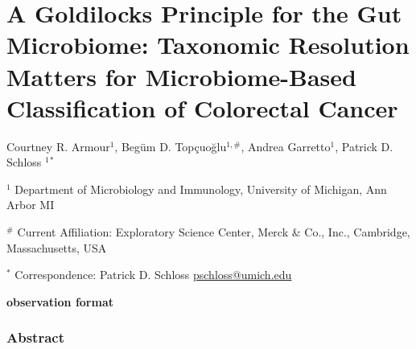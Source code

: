 \documentclass[
]{article}
\author{}
\date{\vspace{-2.5em}}
\begin{document}
\hypertarget{a-goldilocks-principle-for-the-gut-microbiome-taxonomic-resolution-matters-for-microbiome-based-classification-of-colorectal-cancer}{%
\section{A Goldilocks Principle for the Gut Microbiome: Taxonomic
Resolution Matters for Microbiome-Based Classification of Colorectal
Cancer}\label{a-goldilocks-principle-for-the-gut-microbiome-taxonomic-resolution-matters-for-microbiome-based-classification-of-colorectal-cancer}}

\vspace{10mm}

Courtney R. Armour\({^1}\), Begüm D. Topçuoğlu\(^{1,\#}\), Andrea
Garretto\({^1}\), Patrick D. Schloss \({^1}\)\({^*}\)

\vspace{5mm}

\({^1}\) Department of Microbiology and Immunology, University of
Michigan, Ann Arbor MI

\({^\#}\) Current Affiliation: Exploratory Science Center, Merck \& Co.,
Inc., Cambridge, Massachusetts, USA~

\vspace{5mm}

\({^*}\) Correspondence: Patrick D. Schloss
\href{mailto:pschloss@umich.edu}{pschloss@umich.edu}

\vspace{20mm}

\textbf{observation format}

\newpage

\hypertarget{abstract}{%
\subsubsection{Abstract}\label{abstract}}
\end{document}
